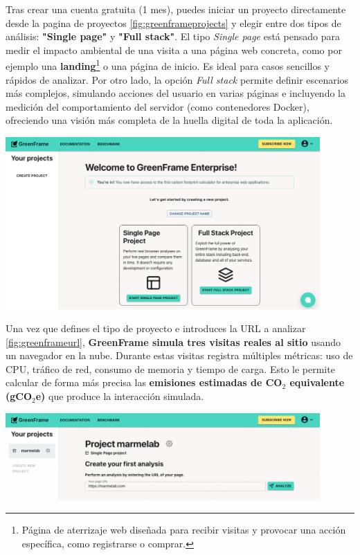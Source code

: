 \documentclass[12pt,a4paper]{report}
\begin{document}
Tras crear una cuenta gratuita (1 mes), puedes iniciar un proyecto directamente 
desde la pagina de proyectos \ref{fig:greenframeprojects} y elegir
entre dos tipos de análisis: \textbf{"Single page"} y \textbf{"Full stack"}. El
tipo \textit{Single page} está pensado para medir el impacto ambiental de una
visita a una página web concreta, como por ejemplo una
\textbf{landing}\footnote{Página de aterrizaje web diseñada para recibir
  visitas y provocar una acción específica, como registrarse o comprar.} o una
página de inicio. Es ideal para casos sencillos y rápidos de analizar. Por otro
lado, la opción \textit{Full stack} permite definir escenarios más complejos,
simulando acciones del usuario en varias páginas e incluyendo la medición del
comportamiento del servidor (como contenedores Docker), ofreciendo una visión
más completa de la huella digital de toda la aplicación.

\begin{center}
  \includegraphics[width=0.9\textwidth]{imagenes/Greenframe_2.png}
  \label{fig:greenframeprojects}
\end{center}

Una vez que defines el tipo de proyecto e introduces la URL a analizar \ref{fig:greenframeurl},
\textbf{GreenFrame simula tres visitas reales al sitio} usando un navegador en
la nube. Durante estas visitas registra múltiples métricas: uso de CPU, tráfico
de red, consumo de memoria y tiempo de carga. Esto le permite calcular de forma
más precisa las \textbf{emisiones estimadas de CO$_2$ equivalente (gCO$_2$e)}
que produce la interacción simulada.

\begin{center}
  \includegraphics[width=0.9\textwidth]{imagenes/Greenframe_3.png}
\end{center}
\end{document}
